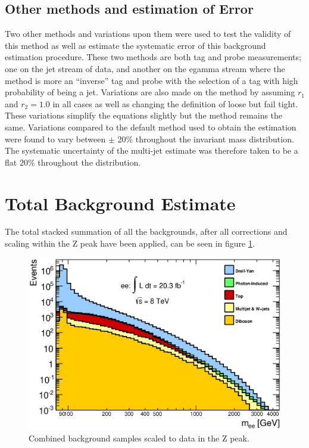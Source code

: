 \subsection{Other methods and estimation of Error}
   \label{sec:MJerror}


Two other methods and variations upon them were used to test the validity of this method as well as estimate the systematic error of this background estimation procedure. These two methods are both tag and probe measurements; one on the jet stream of data, and another on the egamma stream where the method is more an ``inverse'' tag and probe with the selection of a tag with high probability of being a jet. Variations are also made on the method by assuming $r_{1}$ and $r_{2} = 1.0$ in all cases as well as changing the definition of loose but fail tight. These variations simplify the equations slightly but the method remains the same. Variations compared to the default method used to obtain the estimation were found to vary between $\pm$ 20\% throughout the invariant mass distribution. The systematic uncertainty of the multi-jet estimate was therefore taken to be a flat $20\%$ throughout the distribution.





\section{Total Background Estimate}

The total stacked summation of all the backgrounds, after all corrections and scaling within the Z peak have been applied, can be seen in figure \ref{fig:totalBKG}.


   \begin{figure}[h]
      \begin{center}
      \includegraphics[scale=0.8]{images/invMass_bkgonly.eps}
      \end{center}
   \caption{Combined background samples scaled to data in the Z peak.}
   \label{fig:totalBKG}
   \end{figure}






